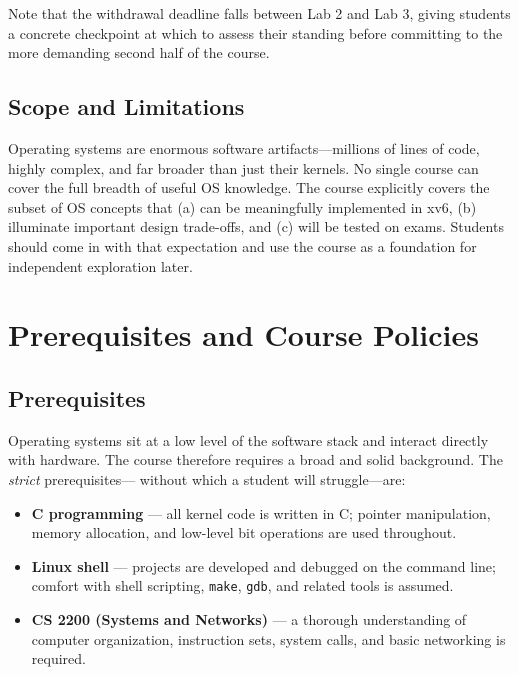 \documentclass[11pt]{article}
\begin{document}
Note that the withdrawal deadline falls between Lab 2 and Lab 3, giving students a concrete
checkpoint at which to assess their standing before committing to the more demanding second half
of the course.

\subsection{Scope and Limitations}

Operating systems are enormous software artifacts---millions of lines of code, highly complex,
and far broader than just their kernels. No single course can cover the full breadth of useful OS
knowledge. The course explicitly covers the subset of OS concepts that (a) can be meaningfully
implemented in xv6, (b) illuminate important design trade-offs, and (c) will be tested on exams.
Students should come in with that expectation and use the course as a foundation for independent
exploration later.

\section{Prerequisites and Course Policies}

\subsection{Prerequisites}

Operating systems sit at a low level of the software stack and interact directly with hardware.
The course therefore requires a broad and solid background. The \emph{strict} prerequisites---
without which a student will struggle---are:

\begin{itemize}
    \item \textbf{C programming} --- all kernel code is written in C; pointer manipulation,
          memory allocation, and low-level bit operations are used throughout.
    \item \textbf{Linux shell} --- projects are developed and debugged on the command line;
          comfort with shell scripting, \texttt{make}, \texttt{gdb}, and related tools is assumed.
    \item \textbf{CS 2200 (Systems and Networks)} --- a thorough understanding of computer
          organization, instruction sets, system calls, and basic networking is required.
\end{itemize}
\end{document}
